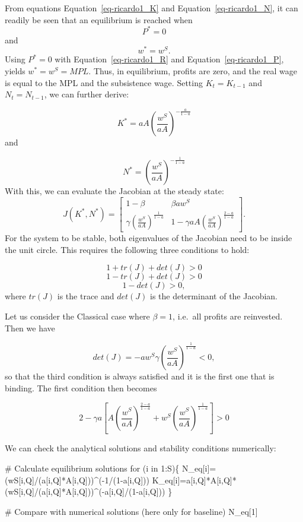 \documentclass[
  letterpaper,
  DIV=11,
  numbers=noendperiod]{scrreprt}
\newenvironment{Shaded}{\begin{snugshade}}{\end{snugshade}}
\newcommand{\CommentTok}[1]{\textcolor[rgb]{0.37,0.37,0.37}{#1}}
\newcommand{\ControlFlowTok}[1]{\textcolor[rgb]{0.00,0.23,0.31}{#1}}
\newcommand{\DecValTok}[1]{\textcolor[rgb]{0.68,0.00,0.00}{#1}}
\newcommand{\NormalTok}[1]{\textcolor[rgb]{0.00,0.23,0.31}{#1}}
\newcommand{\OtherTok}[1]{\textcolor[rgb]{0.00,0.23,0.31}{#1}}
\newcommand{\SpecialCharTok}[1]{\textcolor[rgb]{0.37,0.37,0.37}{#1}}
\begin{document}
From equations Equation~\ref{eq-ricardo1_K} and
Equation~\ref{eq-ricardo1_N}, it can readily be seen that an equilibrium
is reached when \[
P^*=0
\] and \[
w^*=w^S.
\] Using \(P^*=0\) with Equation~\ref{eq-ricardo1_R} and
Equation~\ref{eq-ricardo1_P}, yields \(w^*=w^S=MPL\). Thus, in
equilibrium, profits are zero, and the real wage is equal to the MPL and
the subsistence wage. Setting \(K_t=K_{t-1}\) and \(N_t=N_{t-1}\), we
can further derive:

\[
K^*=aA\left(\frac{w^S}{aA}\right)^{-\frac{a}{1-a}}
\] and

\[
N^*=\left(\frac{w^S}{aA}\right)^{-\frac{1}{1-a}}
\] With this, we can evaluate the Jacobian at the steady state: \[
J(K^*, N^*)=\begin{bmatrix} 1-\beta & \beta a w^S \\ \gamma \left(\frac{w^S}{aA}\right)^{\frac{1}{1-a}} & 1-\gamma aA \left(\frac{w^S}{aA}\right)^{\frac{2-a}{1-a}} 
\end{bmatrix}.
\] For the system to be stable, both eigenvalues of the Jacobian need to
be inside the unit circle. This requires the following three conditions
to hold:

\[
1+tr(J)+det(J)>0
\] \[
1-tr(J)+det(J)>0
\] \[
1-det(J)>0,
\] where \(tr(J)\) is the trace and \(det(J)\) is the determinant of the
Jacobian.

Let us consider the Classical case where \(\beta=1\), i.e.~all profits
are reinvested. Then we have

\[
det(J)=-aw^S \gamma \left(\frac{w^S}{aA}\right)^{\frac{1}{1-a}}<0,
\] so that the third condition is always satisfied and it is the first
one that is binding. The first condition then becomes

\[
2-\gamma a \left[ A \left(\frac{w^S}{aA}\right)^{\frac{2-a}{1-a}} + w^S\left(\frac{w^S}{aA}\right)^{\frac{1}{1-a}} \right]>0
\]

We can check the analytical solutions and stability conditions
numerically:

\begin{Shaded}
\begin{Highlighting}[]
\CommentTok{\# Calculate equilibrium solutions}
\ControlFlowTok{for}\NormalTok{ (i }\ControlFlowTok{in} \DecValTok{1}\SpecialCharTok{:}\NormalTok{S)\{}
\NormalTok{  N\_eq[i]}\OtherTok{=}\NormalTok{(wS[i,Q]}\SpecialCharTok{/}\NormalTok{(a[i,Q]}\SpecialCharTok{*}\NormalTok{A[i,Q]))}\SpecialCharTok{\^{}}\NormalTok{(}\SpecialCharTok{{-}}\DecValTok{1}\SpecialCharTok{/}\NormalTok{(}\DecValTok{1}\SpecialCharTok{{-}}\NormalTok{a[i,Q]))}
\NormalTok{  K\_eq[i]}\OtherTok{=}\NormalTok{a[i,Q]}\SpecialCharTok{*}\NormalTok{A[i,Q]}\SpecialCharTok{*}\NormalTok{(wS[i,Q]}\SpecialCharTok{/}\NormalTok{(a[i,Q]}\SpecialCharTok{*}\NormalTok{A[i,Q]))}\SpecialCharTok{\^{}}\NormalTok{(}\SpecialCharTok{{-}}\NormalTok{a[i,Q]}\SpecialCharTok{/}\NormalTok{(}\DecValTok{1}\SpecialCharTok{{-}}\NormalTok{a[i,Q]))}
\NormalTok{\}}

\CommentTok{\# Compare with numerical solutions (here only for baseline)}
\NormalTok{N\_eq[}\DecValTok{1}\NormalTok{]}
\end{Highlighting}
\end{Shaded}
\end{document}
